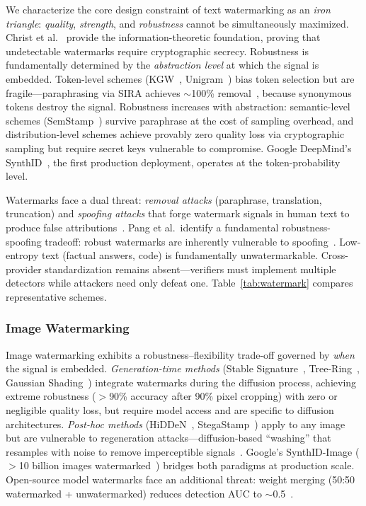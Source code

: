 We characterize the core design constraint of text watermarking as an \emph{iron triangle}: \emph{quality}, \emph{strength}, and \emph{robustness} cannot be simultaneously maximized. Christ et al.~\cite{christ2024undetectable} provide the information-theoretic foundation, proving that undetectable watermarks require cryptographic secrecy. Robustness is fundamentally determined by the \emph{abstraction level} at which the signal is embedded. Token-level schemes (KGW~\cite{kirchenbauer2023kgw}, Unigram~\cite{zhao2023unigram}) bias token selection but are fragile---paraphrasing via SIRA achieves $\sim$100\% removal~\cite{cheng2025sira}, because synonymous tokens destroy the signal. Robustness increases with abstraction: semantic-level schemes (SemStamp~\cite{hou2023semstamp}) survive paraphrase at the cost of sampling overhead, and distribution-level schemes achieve provably zero quality loss via cryptographic sampling but require secret keys vulnerable to compromise. Google DeepMind's SynthID~\cite{synthidtext2024}, the first production deployment, operates at the token-probability level.

Watermarks face a dual threat: \emph{removal attacks} (paraphrase, translation, truncation) and \emph{spoofing attacks} that forge watermark signals in human text to produce false attributions~\cite{sadasivan2023spoofing}. Pang et al.\ identify a fundamental robustness-spoofing tradeoff: robust watermarks are inherently vulnerable to spoofing~\cite{pang2024nofree}. Low-entropy text (factual answers, code) is fundamentally unwatermarkable. Cross-provider standardization remains absent---verifiers must implement multiple detectors while attackers need only defeat one. Table~\ref{tab:watermark} compares representative schemes.

\subsubsection{Image Watermarking}
\label{sec:wm-image}

Image watermarking exhibits a robustness--flexibility trade-off governed by \emph{when} the signal is embedded. \emph{Generation-time methods} (Stable Signature~\cite{fernandez2023stablesig}, Tree-Ring~\cite{wen2023treering}, Gaussian Shading~\cite{yang2024gaussianshading}) integrate watermarks during the diffusion process, achieving extreme robustness ($>$90\% accuracy after 90\% pixel cropping) with zero or negligible quality loss, but require model access and are specific to diffusion architectures. \emph{Post-hoc methods} (HiDDeN~\cite{zhu2018hidden}, StegaStamp~\cite{tancik2020stegastamp}) apply to any image but are vulnerable to regeneration attacks---diffusion-based ``washing'' that resamples with noise to remove imperceptible signals~\cite{zhao2023regeneration}. Google's SynthID-Image ($>$10 billion images watermarked~\cite{gowal2024synthidimage}) bridges both paradigms at production scale. Open-source model watermarks face an additional threat: weight merging (50:50 watermarked + unwatermarked) reduces detection AUC to $\sim$0.5~\cite{xu2025removal}.

